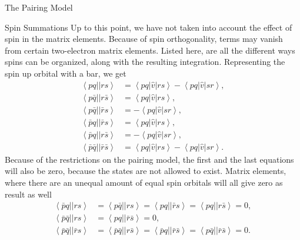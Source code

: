 \documentclass[twoside,english]{uiofysmaster}
\begin{document}
\begin{chapter}{The Pairing Model}
 	\begin{section}{Spin Summations}
 		Up to this point, we have not taken into account the effect of spin in the matrix elements. Because of spin orthogonality, terms may vanish from certain two-electron matrix elements. Listed here, are all the different ways spins can be organized, along with the resulting integration. Representing the spin up orbital with a bar, we get \cite{ShavittAndBartlett}
 		\begin{align}
 			\left< pq || rs \right> &= \left< pq | \hat v | rs \right> - \left< pq | \hat v | sr \right>, \\
 			\left< p\bar q || r\bar s \right> &= \left<pq | \hat v | rs \right> ,\\
 			\left< p \bar q|| \bar r s \right> &= - \left<pq | \hat v | sr \right> ,\\
 			\left< \bar p q|| \bar r s\right> &= \left< pq | \hat v | rs \right>, \\
 			\left< \bar p q|| r \bar s \right> &= - \left< pq | \hat v | sr \right>, \\
 			\left< \bar p \bar q || \bar r \bar s \right> &= \left< pq | \hat v | rs \right> - \left< pq | \hat v | sr \right> .
 		\end{align}
 		Because of the restrictions on the pairing model, the first and the last equations will also be zero, because the states are not allowed to exist. Matrix elements, where there are an unequal amount of equal spin orbitals will all give zero as result as well
 		\begin{align}
 			\left< \bar p q || rs \right> &= \left< p \bar q || rs \right> = \left< pq || \bar r s \right> = \left< pq || r \bar s \right> = 0, \\
 			\left< \bar p \bar q || rs \right> &= \left< pq || \bar r \bar s \right>  = 0 ,\\
 			\left< \bar p \bar q || \bar r s \right> &= \left< \bar p \bar q || r \bar s \right> = \left< \bar p q || \bar r \bar s \right> = \left< p \bar q || \bar r \bar s \right> = 0.
 		\end{align} 


 	\end{section}

\end{chapter}
\end{document}
